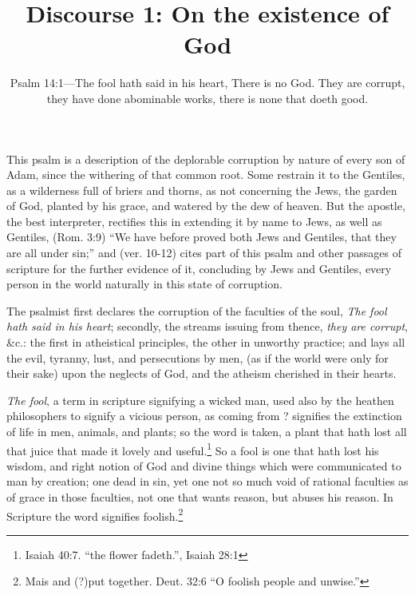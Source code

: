 \documentclass[a5paper]{book}
\title{Discourse 1: On the existence of God}
\date{Psalm 14:1---The fool hath said in his heart, There is no God. They are corrupt, they have done abominable works, there is none that doeth good.}
\begin{document}
\maketitle

This psalm is a description 
    of the deplorable corruption by nature of every son of Adam, 
    since the withering of that common root.
Some restrain it to the Gentiles, 
    as a wilderness full of briers and thorns, 
    as not concerning the Jews, the garden of God, 
    planted by his grace, and watered by the dew of heaven. 
But the apostle, the best interpreter, 
    rectifies this in extending it by name to Jews, as well as Gentiles, 
    (Rom. 3:9) ``We have before proved both Jews and Gentiles, 
    that they are all under sin;'' and 
    (ver. 10-12) cites part of this psalm and other passages of scripture 
    for the further evidence of it, 
    concluding by Jews and Gentiles, 
    every person in the world naturally in this state of corruption.

The psalmist first declares the corruption of the faculties of the soul, 
    \emph{The fool hath said in his heart}; 
    secondly, the streams issuing from thence, \emph{they are corrupt}, \&c.: 
    the first in atheistical principles,
    the other in unworthy practice; 
    and lays all the evil, tyranny, lust, and persecutions by men, 
    (as if the world were only for their sake) upon the neglects of God, 
    and the atheism cherished in their hearts.

\emph{The fool}, a term in scripture signifying a wicked man, 
    used also by the heathen philosophers to signify a vicious person, 
     as coming from ? 
    signifies the extinction of life in men, animals, and plants; 
    so the word  is taken, 
    a plant that hath lost all that juice that made it lovely and useful.\footnote{
        Isaiah 40:7.  ``the flower fadeth.'', Isaiah 28:1} 
So a fool is one that hath lost his wisdom, 
    and right notion of God and divine things 
    which were communicated to man by creation; 
    one dead in sin, 
    yet one not so much void of rational faculties 
    as of grace in those faculties, 
    not one that wants reason, but abuses his reason. 
In Scripture the word signifies foolish.\footnote{
        Mais  and (?)put together. 
        Deut. 32:6 ``O foolish people and unwise.''} 
\end{document}
